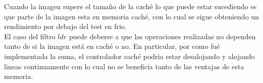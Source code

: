 Cuando la imagen supere el tamaño de la caché lo que puede estar sucediendo es que parte de la imagen esta en memoria caché, con lo cual se sigue obteniendo un rendimiento por debajo del test en frio.\\

El caso del filtro $ldr$ puede deberse a que las operaciones realizadas no dependen tanto de si la imagen está en caché o no. En particular, por como fué implementada la suma, el controlador caché podria estar desalojando y alojando lineas continuamente con lo cual no se beneficia tanto de las ventajas de esta memoria.

